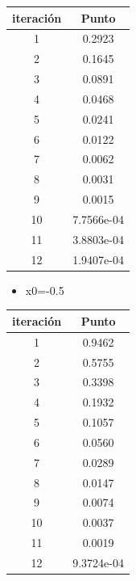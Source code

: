 \documentclass{udpreport}
\begin{document}
\begin{enumerate}
\begin{enumerate}
\begin{table}[H]
\begin{tabular} { |c|c|}
        \hline
        iteración  &  Punto\\
        \hline
        1 &   0.2923       \\
         \hline
        2 &     0.1645   \\
         \hline
        3 &  0.0891 \\
         \hline
        4 &  0.0468     \\
         \hline
        5 &    0.0241    \\
         \hline
        6 & 0.0122       \\
         \hline
        7 &    0.0062 \\
         \hline
        8 &  0.0031     \\
         \hline
        9 &      0.0015    \\
         \hline
        10 &    7.7566e-04     \\
         \hline
        11 &   3.8803e-04  \\
         \hline
        12 &   1.9407e-04      \\
        \hline
        
        \end{tabular}
        
    \end{table}
 \begin{itemize}
\item x0=-0.5
\end{itemize}

\begin{table}[H]
    \centering
        \begin{tabular} { |c|c|}
        
        \hline
        iteración  &  Punto\\
        \hline
        1 &  0.9462        \\
         \hline
        2 &     0.5755  \\
         \hline
        3 &    0.3398        \\
 
         \hline
        4 &   0.1932  \\
         \hline
        5 &  0.1057       \\
         \hline
        6 &      0.0560  \\
         \hline
        7 & 0.0289    \\
         \hline
        8 & 0.0147      \\
         \hline
        9 &   0.0074       \\
         \hline
        10 &    0.0037     \\
         \hline
        11 &   0.0019  \\
         \hline
        12 &   9.3724e-04     \\
        \hline
        

\end{tabular}
\end{table}
\end{enumerate}
\end{enumerate}
\end{document}
